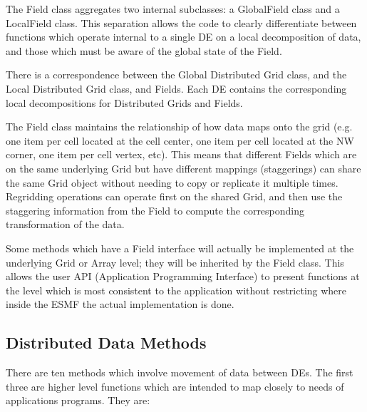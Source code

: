



The Field class aggregates two internal subclasses: a GlobalField class
and a LocalField class.  This separation allows the code to clearly
differentiate between functions which operate internal to a single DE
on a local decomposition of data, 
and those which must be aware of the
global state of the Field.  
 
There is a correspondence between the Global Distributed Grid class,
and the Local Distributed Grid class, and Fields.  Each DE contains
the corresponding local decompositions for Distributed Grids and Fields.

The Field class maintains the relationship of
how data maps onto the grid (e.g. one item per cell located at
the cell center, one item per cell located at the NW corner, 
one item per cell vertex, etc).  This means that different Fields
which are on the same underlying Grid but have different
mappings (staggerings) can share the same Grid object without
needing to copy or replicate it multiple times.  Regridding
operations can operate first on the shared Grid, and then
use the staggering information from the Field to compute the
corresponding transformation of the data.

Some methods which have a Field interface will actually be
implemented at the underlying Grid or Array level; they
will be inherited by the Field class.  This allows the user
API (Application Programming Interface) to present functions at
the level which is most consistent to the application without
restricting where inside the ESMF the actual implementation
is done.




\subsection{Distributed Data Methods}

There are ten methods which involve movement of data between DEs.
The first three are higher level functions which are intended to
map closely to needs of applications programs.  They are:

